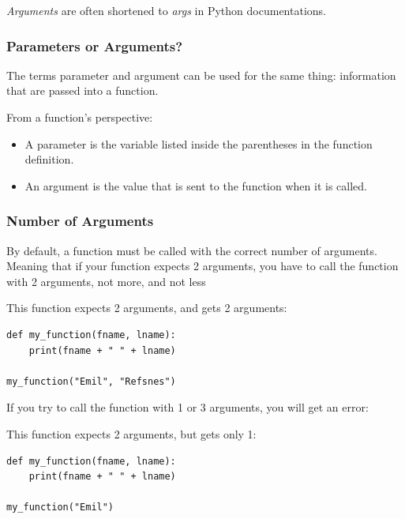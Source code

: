 \documentclass[12pt,a4paper]{article}
\begin{document}
\begin{nbox}
\textit{Arguments} are often shortened to \textit{args} in Python
documentations.
\end{nbox}

\subsubsection{Parameters or Arguments?}

The terms parameter and argument can be used for the same thing: information
that are passed into a function.

\begin{nbox}
From a function's perspective:

\begin{itemize}
\item A parameter is the variable listed inside the parentheses in the function
	definition.
\item An argument is the value that is sent to the function when it is called.
\end{itemize}
\end{nbox}
\subsubsection{Number of Arguments}

By default, a function must be called with the correct number of arguments.
Meaning that if your function expects 2 arguments, you have to call the
function with 2 arguments, not more, and not less

\begin{ebox}
This function expects 2 arguments, and gets 2 arguments:
	\begin{lstlisting}
def my_function(fname, lname):
    print(fname + " " + lname)

my_function("Emil", "Refsnes")
	\end{lstlisting}
\end{ebox}

If you try to call the function with 1 or 3 arguments, you will get an error:

\begin{ebox}
This function expects 2 arguments, but gets only 1:
	\begin{lstlisting}
def my_function(fname, lname):
    print(fname + " " + lname)

my_function("Emil") 
	\end{lstlisting}
\tcblower
	\begin{vercode}

	\end{vercode}
\end{ebox}
\end{document}
